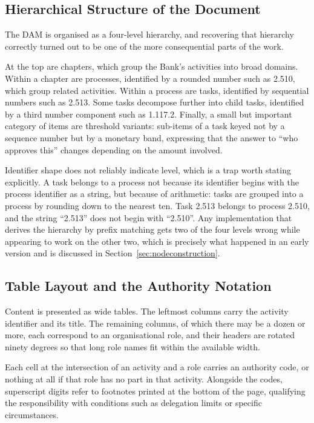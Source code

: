 \subsection{Hierarchical Structure of the Document}

The DAM is organised as a four-level hierarchy, and recovering that hierarchy correctly turned out to be one of the more consequential parts of the work.

At the top are chapters, which group the Bank's activities into broad domains. Within a chapter are processes, identified by a rounded number such as 2.510, which group related activities. Within a process are tasks, identified by sequential numbers such as 2.513. Some tasks decompose further into child tasks, identified by a third number component such as 1.117.2. Finally, a small but important category of items are threshold variants: sub-items of a task keyed not by a sequence number but by a monetary band, expressing that the answer to ``who approves this'' changes depending on the amount involved.

Identifier shape does not reliably indicate level, which is a trap worth stating explicitly. A task belongs to a process not because its identifier begins with the process identifier as a string, but because of arithmetic: tasks are grouped into a process by rounding down to the nearest ten. Task 2.513 belongs to process 2.510, and the string ``2.513'' does not begin with ``2.510''. Any implementation that derives the hierarchy by prefix matching gets two of the four levels wrong while appearing to work on the other two, which is precisely what happened in an early version and is discussed in Section~\ref{sec:nodeconstruction}.

\subsection{Table Layout and the Authority Notation}

Content is presented as wide tables. The leftmost columns carry the activity identifier and its title. The remaining columns, of which there may be a dozen or more, each correspond to an organisational role, and their headers are rotated ninety degrees so that long role names fit within the available width.

Each cell at the intersection of an activity and a role carries an authority code, or nothing at all if that role has no part in that activity. Alongside the codes, superscript digits refer to footnotes printed at the bottom of the page, qualifying the responsibility with conditions such as delegation limits or specific circumstances.

